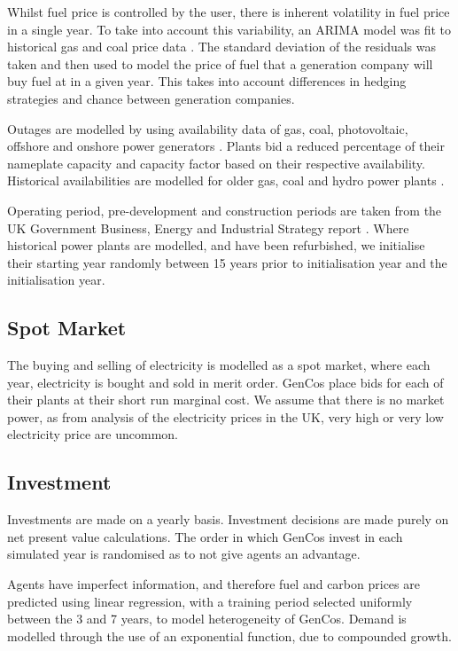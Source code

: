 Whilst fuel price is controlled by the user, there is inherent volatility in fuel price in a single year. To take into account this variability, an ARIMA model was fit to historical gas and coal price data \cite{coalprices,gasprices}. The standard deviation of the residuals was taken and then used to model the price of fuel that a generation company will buy fuel at in a given year. This takes into account differences in hedging strategies and chance between generation companies.

Outages are modelled by using availability data of gas, coal, photovoltaic, offshore and onshore power generators \cite{Ltd2016, Hunt2015, carroll-j}. Plants bid a reduced percentage of their nameplate capacity and capacity factor based on their respective availability. Historical availabilities are modelled for older gas, coal and hydro power plants \cite{AlbertaSystemElectricOperator2016}.

Operating period, pre-development and construction periods are taken from the UK Government Business, Energy and Industrial Strategy report \cite{Department2016}. Where historical power plants are modelled, and have been refurbished, we initialise their starting year randomly between 15 years prior to initialisation year and the initialisation year.


\subsection{Spot Market}

The buying and selling of electricity is modelled as a spot market, where each year, electricity is bought and sold in merit order. GenCos place bids for each of their plants at their short run marginal cost. We assume that there is no market power, as from analysis of the electricity prices in the UK, very high or very low electricity price are uncommon.

\subsection{Investment}

Investments are made on a yearly basis. Investment decisions are made purely on net present value calculations. The order in which GenCos invest in each simulated year is randomised as to not give agents an advantage.

Agents have imperfect information, and therefore fuel and carbon prices are predicted using linear regression, with a training period selected uniformly between the 3 and 7 years, to model heterogeneity of GenCos. Demand is modelled through the use of an exponential function, due to compounded growth.

